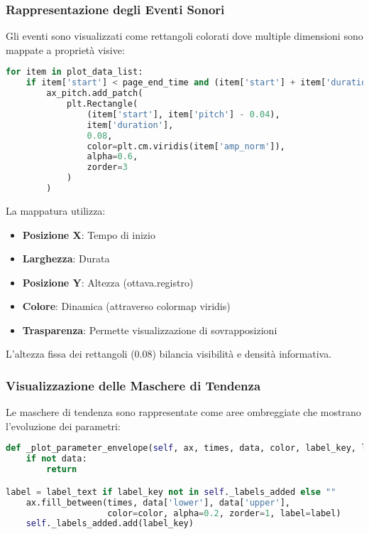 \subsubsection{Rappresentazione degli Eventi Sonori}
Gli eventi sono visualizzati come rettangoli colorati dove multiple dimensioni sono mappate a proprietà visive:

\begin{lstlisting}[language=Python]
for item in plot_data_list:
    if item['start'] < page_end_time and (item['start'] + item['duration']) > page_start_time:
        ax_pitch.add_patch(
            plt.Rectangle(
                (item['start'], item['pitch'] - 0.04), 
                item['duration'], 
                0.08, 
                color=plt.cm.viridis(item['amp_norm']), 
                alpha=0.6, 
                zorder=3
            )
        )
\end{lstlisting}

La mappatura utilizza:
\begin{itemize}
    \item \textbf{Posizione X}: Tempo di inizio
    \item \textbf{Larghezza}: Durata
    \item \textbf{Posizione Y}: Altezza (ottava.registro)
    \item \textbf{Colore}: Dinamica (attraverso colormap viridis)
    \item \textbf{Trasparenza}: Permette visualizzazione di sovrapposizioni
\end{itemize}

L'altezza fissa dei rettangoli (0.08) bilancia visibilità e densità informativa.
\subsubsection{Visualizzazione delle Maschere di Tendenza}
Le maschere di tendenza sono rappresentate come aree ombreggiate che mostrano l'evoluzione dei parametri:

\begin{lstlisting}[language=Python]
def _plot_parameter_envelope(self, ax, times, data, color, label_key, label_text):
    if not data:
        return

label = label_text if label_key not in self._labels_added else ""
    ax.fill_between(times, data['lower'], data['upper'], 
                    color=color, alpha=0.2, zorder=1, label=label)
    self._labels_added.add(label_key)
\end{lstlisting}


